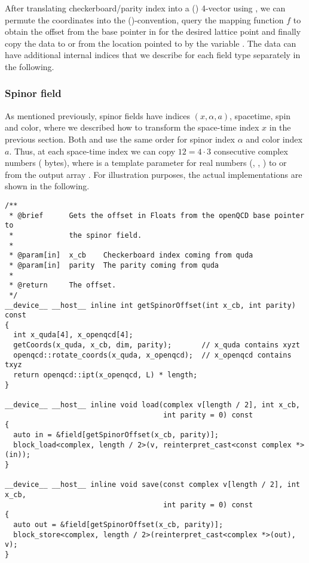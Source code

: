 After translating \qudas checkerboard/parity index into a (\xyzt) 4-vector using , we can permute the coordinates into the (\txyz)-convention, query the mapping function $f$ to obtain the offset from the base pointer in \openqxd for the desired lattice point and finally copy the data to or from the location pointed to by the variable .
The data can have additional internal indices that we describe for each field type separately in the following.

\subsubsection{Spinor field}

As mentioned previously, spinor fields have indices $(x,\alpha,a)$, spacetime, spin and color, where we described how to transform the space-time index $x$ in the previous section.
Both \quda and \openqxd use the same order for spinor index $\alpha$ and color index $a$.
Thus, at each space-time index we can copy $12=4 \cdot 3$ consecutive complex numbers (\ie {} bytes), where  is a template parameter for real numbers (, , ) to or from the output array .
For illustration purposes, the actual implementations are shown in the following.
\begin{verbatim}
/**
 * @brief      Gets the offset in Floats from the openQCD base pointer to
 *             the spinor field.
 *
 * @param[in]  x_cb    Checkerboard index coming from quda
 * @param[in]  parity  The parity coming from quda
 *
 * @return     The offset.
 */
__device__ __host__ inline int getSpinorOffset(int x_cb, int parity) const
{
  int x_quda[4], x_openqcd[4];
  getCoords(x_quda, x_cb, dim, parity);       // x_quda contains xyzt
  openqcd::rotate_coords(x_quda, x_openqcd);  // x_openqcd contains txyz
  return openqcd::ipt(x_openqcd, L) * length;
}

__device__ __host__ inline void load(complex v[length / 2], int x_cb,
                                     int parity = 0) const
{
  auto in = &field[getSpinorOffset(x_cb, parity)];
  block_load<complex, length / 2>(v, reinterpret_cast<const complex *>(in));
}

__device__ __host__ inline void save(const complex v[length / 2], int x_cb,
                                     int parity = 0) const
{
  auto out = &field[getSpinorOffset(x_cb, parity)];
  block_store<complex, length / 2>(reinterpret_cast<complex *>(out), v);
}
\end{verbatim}

